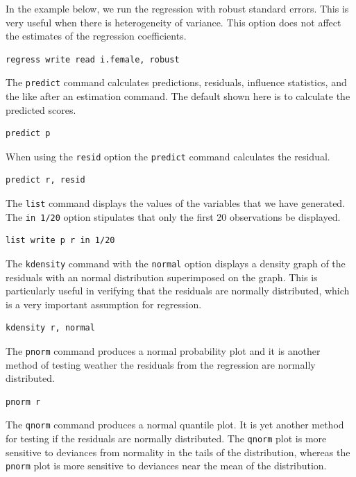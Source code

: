 \documentclass{article}
\begin{document}
In the example below, we run the regression with robust standard errors. This is very useful when there is heterogeneity of variance. This option does not affect the estimates of the regression coefficients.

\begin{lstlisting}
regress write read i.female, robust
\end{lstlisting}

The \lstinline{predict} command calculates predictions, residuals, influence statistics, and the like after an estimation command. The default shown here is to calculate the predicted scores.

\begin{lstlisting}
predict p
\end{lstlisting}

When using the \lstinline{resid} option the \lstinline{predict} command calculates the residual.

\begin{lstlisting}
predict r, resid
\end{lstlisting}

The \lstinline{list} command displays the values of the variables that we have generated. The \lstinline{in 1/20} option stipulates that only the first 20 observations be displayed.

\begin{lstlisting}
list write p r in 1/20
\end{lstlisting}

The \lstinline{kdensity} command with the \lstinline{normal} option displays a density graph of the residuals with an normal distribution superimposed on the graph. This is particularly useful in verifying that the residuals are normally distributed, which is a very important assumption for regression.

\begin{lstlisting}
kdensity r, normal
\end{lstlisting}

The \lstinline{pnorm} command produces a normal probability plot and it is another method of testing weather the residuals from the regression are normally distributed.

\begin{lstlisting}
pnorm r
\end{lstlisting}

The \lstinline{qnorm} command produces a normal quantile plot. It is yet another method for testing if the residuals are normally distributed. The \lstinline{qnorm} plot is more sensitive to deviances from normality in the tails of the distribution, whereas the \lstinline{pnorm} plot is more sensitive to deviances near the mean of the distribution.
\end{document}
